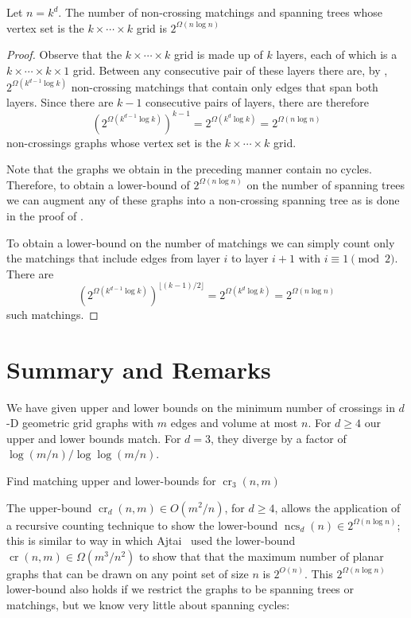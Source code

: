 \documentclass{patmorin}
\DeclareMathOperator{\crs}{cr}
\DeclareMathOperator{\ncs}{ncs}
\begin{document}
\begin{cor}
  Let $n=k^d$.  The number of non-crossing matchings and spanning trees
  whose vertex set is the $k\times\cdots\times k$ grid is $2^{\Omega(n\log
  n)}$
\end{cor}

\begin{proof}
  Observe that the $k\times\cdots\times k$ grid is made up of $k$ layers,
  each of which is a $k\times\cdots\times k\times1$ grid. Between any
  consecutive pair of these layers there are, by ,
  $2^{\Omega(k^{d-1}\log k)}$ non-crossing matchings that contain only
  edges that span both layers.  Since there are $k-1$ consecutive pairs
  of layers, there are therefore
  \[
     \left(2^{\Omega(k^{d-1}\log k)}\right)^{k-1} = 2^{\Omega(k^d\log k)} 
        = 2^{\Omega(n\log n)}
  \]
  non-crossings graphs whose vertex set is the $k\times\cdots\times k$ grid.

  Note that the graphs we obtain in the preceding manner contain
  no cycles.  Therefore, to obtain a lower-bound of $2^{\Omega(n\log
  n)}$ on the number of spanning trees we can augment any of these
  graphs into a non-crossing spanning tree as is done in the proof of
  .

  To obtain a lower-bound on the number of matchings we can simply count
  only the matchings that include edges from layer $i$ to layer $i+1$
  with $i\equiv 1\pmod 2$.  There are
  \[
     \left(2^{\Omega(k^{d-1}\log k)}\right)^{\lfloor (k-1)/2\rfloor} 
       = 2^{\Omega(k^d\log k)}
       = 2^{\Omega(n\log n)}
  \]
  such matchings.
\end{proof}


\section{Summary and Remarks}

We have given upper and lower bounds on the minimum number of crossings
in $d$-D geometric grid graphs with $m$ edges and volume at most $n$.
For $d\ge 4$ our upper and lower bounds match.  For $d=3$, they diverge
by a factor of $\log(m/n)/\log\log(m/n)$.

\begin{op}
  Find matching upper and lower-bounds for $\crs_3(n,m)$
\end{op}

The upper-bound $\crs_d(n,m)\in O(m^2/n)$, for $d\ge 4$, allows the
application of a recursive counting technique to show the lower-bound
$\ncs_d(n)\in 2^{\Omega(n\log n)}$; this is similar to way in which Ajtai
\etal\ used the lower-bound $\crs(n,m)\in\Omega(m^3/n^2)$ to show that
that the maximum number of planar graphs that can be drawn on any point
set of size $n$ is $2^{O(n)}$.  This $2^{\Omega(n\log n)}$ lower-bound
also holds if we restrict the graphs to be spanning trees or matchings,
but we know very little about spanning cycles:
\end{document}
